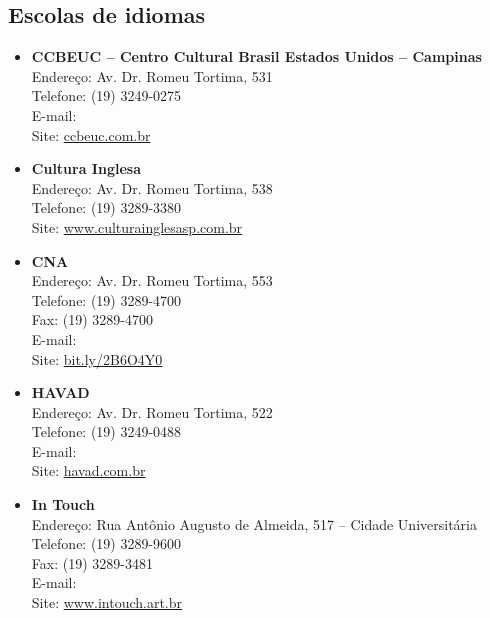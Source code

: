 \subsection{Escolas de idiomas}

\begin{itemize}

    \item \textbf{CCBEUC -- Centro Cultural Brasil Estados Unidos --
    Campinas}
        \\Endereço: Av. Dr. Romeu Tortima, 531
        \\Telefone: (19) 3249-0275
        \\E-mail: 
        \\Site: \url{ccbeuc.com.br}

    \item \textbf{Cultura Inglesa}
        \\Endereço: Av. Dr. Romeu Tortima, 538
        \\Telefone: (19) 3289-3380
        \\Site: \url{www.culturainglesasp.com.br}

    \item \textbf{CNA}
        \\Endereço: Av. Dr. Romeu Tortima, 553
        \\Telefone: (19) 3289-4700
        \\Fax: (19) 3289-4700
        \\E-mail: 
        \\Site: \url{bit.ly/2B6O4Y0}

    \item \textbf{HAVAD}
        \\Endereço: Av. Dr. Romeu Tortima, 522
        \\Telefone: (19) 3249-0488
        \\E-mail: 
        \\Site: \url{havad.com.br}

    \item \textbf{In Touch}
        \\Endereço: Rua Antônio Augusto de Almeida, 517 -- Cidade Universitária
        \\Telefone: (19) 3289-9600
        \\Fax: (19) 3289-3481
        \\E-mail: 
        \\Site: \url{www.intouch.art.br}


\end{itemize}
